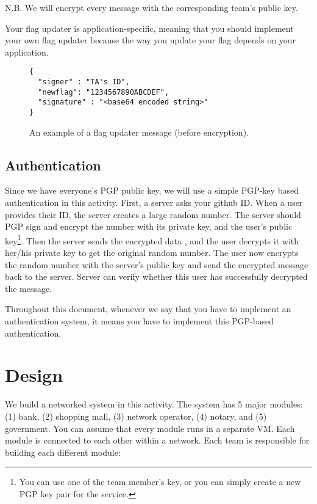 \documentclass[a4paper, 11pt]{article}
\newcommand*{\modone}{bank\xspace}%
\newcommand*{\modtwo}{shopping mall\xspace}%
\newcommand*{\modthree}{network operator\xspace}%
\newcommand*{\modfour}{notary\xspace}%
\newcommand*{\modfive}{government\xspace}%
\theoremstyle{definition}
\begin{document}
{N.B. We will encrypt every message with the corresponding team's
public key\footnotemark[1].

Your flag updater is application-specific, meaning that you should
implement your own flag updater because the way you update your flag
depends on your application.

\begin{figure}[t]
\begin{lstlisting}[basicstyle=\ttfamily]
{
  "signer" : "TA's ID",
  "newflag": "1234567890ABCDEF",
  "signature" : "<base64 encoded string>"
}
\end{lstlisting}
\caption{An example of a flag updater message (before encryption).}
\label{fig:flagupdater}
\end{figure}

\subsection{Authentication} \label{ss:auth}

Since we have everyone's PGP public key, we will use a simple PGP-key
based authentication in this activity. First, a server asks your
github ID. When a user provides their ID, the server creates a large
random number. The server should PGP sign and encrypt the number with
its private key, and the user's public key\footnote{
%
  You can use one of the team member's key, or you can simply create a
  new PGP key pair for the service.
%
}. Then the server sends the encrypted data , and the user decrypts it
with her/his private key to get the original random number. The user
now encrypts the random number with the server's public key and send
the encrypted message back to the server. Server can verify whether
this user has successfully decrypted the message.

Throughout this document, whenever we say that you have to implement
an authentication system, it means you have to implement this
PGP-based authentication.

\section{Design}

We build a networked system in this activity. The system has 5 major
modules: (1) \modone, (2) \modtwo, (3) \modthree, (4) \modfour, and
(5) \modfive. You can assume that every module runs in a separate VM.
Each module is connected to each other within a network. Each team is
responsible for building each different module:

}
\end{document}
